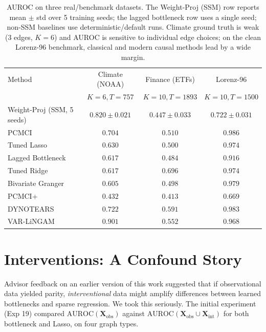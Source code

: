 \documentclass{article}
\begin{document}
\begin{table}[t]
\centering
\small
\caption{AUROC on three real/benchmark datasets. The Weight-Proj (SSM)
row reports mean $\pm$ std over 5 training seeds; the lagged bottleneck
row uses a single seed; non-SSM baselines use deterministic/default
runs. Climate ground truth is weak (3 edges, $K{=}6$) and AUROC is
sensitive to individual edge choices; on the clean Lorenz-96 benchmark,
classical and modern causal methods lead by a wide margin.}
\label{tab:real}
\begin{tabular}{lccc}
\toprule
Method & Climate (NOAA) & Finance (ETFs) & Lorenz-96 \\
 & $K{=}6, T{=}757$ & $K{=}10, T{=}1893$ & $K{=}10, T{=}1500$ \\
\midrule
Weight-Proj (SSM, 5 seeds) & $0.820 \pm 0.021$ & $0.447 \pm 0.033$ & $0.722 \pm 0.031$ \\
PCMCI & $0.704$ & $0.510$ & $\mathbf{0.986}$ \\
Tuned Lasso & $0.630$ & $0.500$ & $0.974$ \\
Lagged Bottleneck & $0.617$ & $0.484$ & $0.916$ \\
Tuned Ridge & $0.617$ & $\mathbf{0.696}$ & $0.974$ \\
Bivariate Granger & $0.605$ & $0.498$ & $0.979$ \\
PCMCI+ & $0.432$ & $0.413$ & $0.669$ \\
DYNOTEARS & $0.722$ & $0.591$ & $0.983$ \\
VAR-LiNGAM & $\mathbf{0.901}$ & $0.552$ & $0.968$ \\
\bottomrule
\end{tabular}
\end{table}

\section{Interventions: A Confound Story}
\label{sec:intervention}

Advisor feedback on an earlier version of this work suggested that if
observational data yielded parity, \emph{interventional} data might
amplify differences between learned bottlenecks and sparse
regression. We took this seriously. The initial experiment (Exp 19)
compared $\text{AUROC}(\mathbf{X}_{\text{obs}})$ against
$\text{AUROC}(\mathbf{X}_{\text{obs}} \cup \mathbf{X}_{\text{int}})$
for both bottleneck and Lasso, on four graph types.
\end{document}
